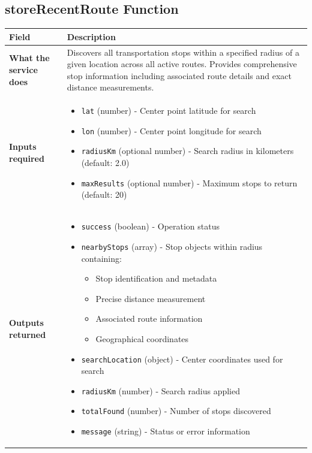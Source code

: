 \documentclass[11pt,a4paper]{article}
\begin{document}
\subsection{storeRecentRoute Function}

\begin{longtable}{|p{3cm}|p{12cm}|}
\hline
\textbf{Field} & \textbf{Description} \\
\hline
\textbf{What the service does} & 
Discovers all transportation stops within a specified radius of a given location across all active routes. Provides comprehensive stop information including associated route details and exact distance measurements. \\
\hline
\textbf{Inputs required} & 
\begin{itemize}[nosep]
\item \texttt{lat} (number) - Center point latitude for search
\item \texttt{lon} (number) - Center point longitude for search
\item \texttt{radiusKm} (optional number) - Search radius in kilometers (default: 2.0)
\item \texttt{maxResults} (optional number) - Maximum stops to return (default: 20)
\end{itemize} \\
\hline
\textbf{Outputs returned} & 
\begin{itemize}[nosep]
\item \texttt{success} (boolean) - Operation status
\item \texttt{nearbyStops} (array) - Stop objects within radius containing:
  \begin{itemize}[nosep]
  \item Stop identification and metadata
  \item Precise distance measurement
  \item Associated route information
  \item Geographical coordinates
  \end{itemize}
\item \texttt{searchLocation} (object) - Center coordinates used for search
\item \texttt{radiusKm} (number) - Search radius applied
\item \texttt{totalFound} (number) - Number of stops discovered
\item \texttt{message} (string) - Status or error information
\end{itemize} \\

\end{longtable}
\end{document}
